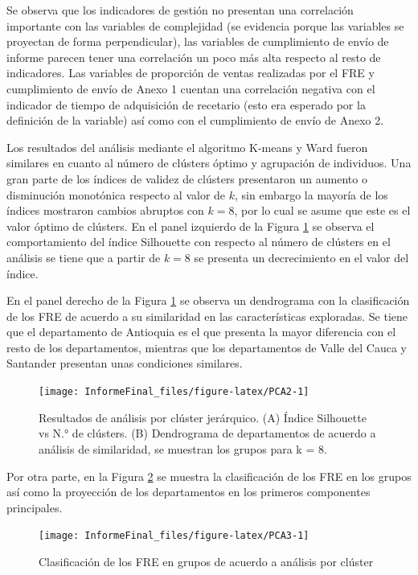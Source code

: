 \documentclass[
  oneside]{book}
\begin{document}
Se observa que los indicadores de gestión no presentan una correlación importante con las variables de complejidad (se evidencia porque las variables se proyectan de forma perpendicular), las variables de cumplimiento de envío de informe parecen tener una correlación un poco más alta respecto al resto de indicadores. Las variables de proporción de ventas realizadas por el FRE y cumplimiento de envío de Anexo 1 cuentan una correlación negativa con el indicador de tiempo de adquisición de recetario (esto era esperado por la definición de la variable) así como con el cumplimiento de envío de Anexo 2.

Los resultados del análisis mediante el algoritmo K-means y Ward fueron similares en cuanto al número de clústers óptimo y agrupación de individuos. Una gran parte de los índices de validez de clústers presentaron un aumento o disminución monotónica respecto al valor de \(k\), sin embargo la mayoría de los índices mostraron cambios abruptos con \(k=8\), por lo cual se asume que este es el valor óptimo de clústers. En el panel izquierdo de la Figura \ref{fig:PCA2} se observa el comportamiento del índice Silhouette con respecto al número de clústers en el análisis se tiene que a partir de \(k=8\) se presenta un decrecimiento en el valor del índice.

En el panel derecho de la Figura \ref{fig:PCA2} se observa un dendrograma con la clasificación de los FRE de acuerdo a su similaridad en las características exploradas. Se tiene que el departamento de Antioquia es el que presenta la mayor diferencia con el resto de los departamentos, mientras que los departamentos de Valle del Cauca y Santander presentan unas condiciones similares.

\begin{figure}[t]

{\centering \texttt{[image: InformeFinal\_files/figure-latex/PCA2-1]} 

}

\caption{Resultados de análisis por clúster jerárquico. (A) Índice Silhouette vs N.° de clústers. (B) Dendrograma de departamentos de acuerdo a análisis de similaridad, se muestran los grupos para k = 8.}\label{fig:PCA2}
\end{figure}

Por otra parte, en la Figura \ref{fig:PCA3} se muestra la clasificación de los FRE en los grupos así como la proyección de los departamentos en los primeros componentes principales.

\begin{figure}[t]

{\centering \texttt{[image: InformeFinal\_files/figure-latex/PCA3-1]} 

}

\caption{Clasificación de los FRE en grupos de acuerdo a análisis por clúster}\label{fig:PCA3}
\end{figure}
\end{document}
